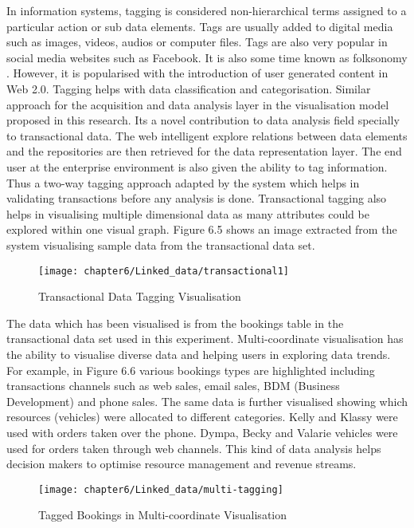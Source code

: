 In information systems, tagging is considered non-hierarchical terms assigned to a particular action or sub data elements. Tags are usually added to digital media such as images, videos, audios or computer files. Tags are also very popular in social media websites such as Facebook. It is also some time known as folksonomy \cite{o2009web}. However, it is popularised with the introduction of user generated content in Web 2.0. Tagging helps with data classification and categorisation. Similar approach for the acquisition and data analysis layer in the visualisation model proposed in this research. Its a novel contribution to data analysis field specially to transactional data. The web intelligent explore relations between data elements and the repositories are then retrieved for the data representation layer. The end user at the enterprise environment is also given the ability to tag information. Thus a two-way tagging approach adapted by the system which helps in validating transactions before any analysis is done. Transactional tagging also helps in visualising multiple dimensional data as many attributes could be explored within one visual graph. Figure 6.5 shows an image extracted from the system visualising sample data from the transactional data set.\\
\begin{figure}[H]
\centering
\texttt{[image: chapter6/Linked\_data/transactional1]}
\caption{Transactional Data Tagging Visualisation}
\end{figure}

The data which has been visualised is from the bookings table in the transactional data set used in this experiment. Multi-coordinate visualisation has the ability to visualise diverse data and helping users in exploring data trends. For example, in Figure 6.6 various bookings types are highlighted including transactions channels such as web sales, email sales, BDM (Business Development) and phone sales. The same data is further visualised showing which resources (vehicles) were allocated to different categories. Kelly and Klassy were used with orders taken over the phone. Dympa, Becky and Valarie vehicles were used for orders taken through web channels. This kind of data analysis helps decision makers to optimise resource management and revenue streams.

\begin{figure}[H]
\centering
\texttt{[image: chapter6/Linked\_data/multi-tagging]}
\caption{Tagged Bookings in Multi-coordinate Visualisation}
\end{figure}

